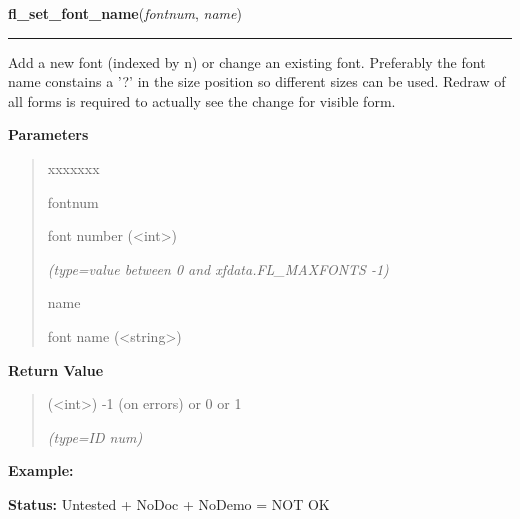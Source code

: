     \vspace{0.5ex}

\hspace{.8\funcindent}\begin{boxedminipage}{\funcwidth}

    \raggedright \textbf{fl\_set\_font\_name}(\textit{fontnum}, \textit{name})

    \vspace{-1.5ex}

    \rule{\textwidth}{0.5\fboxrule}
\setlength{\parskip}{2ex}
    Add a new font (indexed by n) or change an existing font. Preferably 
    the font name constains a '?' in the size position so different sizes 
    can be used. Redraw of all forms is required to actually see the change
    for visible form.

\setlength{\parskip}{1ex}
      \textbf{Parameters}
      \vspace{-1ex}

      \begin{quote}
        \begin{Ventry}{xxxxxxx}

          \item[fontnum]

          font number ({\textless}int{\textgreater})

            {\it (type=value between 0 and xfdata.FL\_MAXFONTS -1)}

          \item[name]

          font name ({\textless}string{\textgreater})

        \end{Ventry}

      \end{quote}

      \textbf{Return Value}
    \vspace{-1ex}

      \begin{quote}
      ({\textless}int{\textgreater}) -1 (on errors) or 0 or 1

      {\it (type=ID num)}

      \end{quote}

\textbf{Example:} 

\textbf{Status:} Untested + NoDoc + NoDemo = NOT OK



    \end{boxedminipage}

